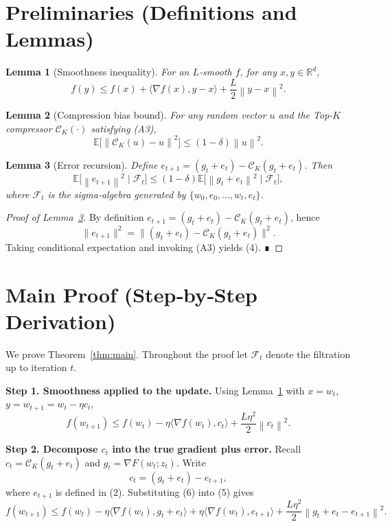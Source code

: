 \documentclass{article}
\newtheorem{lemma}{Lemma}
\newcommand{\E}{\mathbb{E}}
\newcommand{\R}{\mathbb{R}}
\newcommand{\norm}[1]{\left\|#1\right\|}
\newcommand{\grad}{\nabla}
\newcommand{\topk}[1]{\mathcal{C}_{K}(#1)}
\begin{document}
\newpage
\section*{Preliminaries (Definitions and Lemmas)}
\begin{lemma}[Smoothness inequality]\label{lem:smooth}
For an $L$‑smooth $f$, for any $x,y\in\R^{d}$,
\[
f(y)\le f(x)+\langle\grad f(x),y-x\rangle+\frac{L}{2}\norm{y-x}^{2}.
\]
\end{lemma}

\begin{lemma}[Compression bias bound]\label{lem:compression-bias}
For any random vector $u$ and the Top‑$K$ compressor $\topk{\cdot}$ satisfying (A3),
\[
\E\!\big[\norm{\topk{u}-u}^{2}\big]\le (1-\delta)\norm{u}^{2}.
\]
\end{lemma}

\begin{lemma}[Error recursion]\label{lem:error-bnd}
Define $e_{t+1}=(g_t+e_t)-\topk{g_t+e_t}$. Then
\[
\E\!\big[\norm{e_{t+1}}^{2}\mid\mathcal F_t\big]\le (1-\delta)\E\!\big[\norm{g_t+e_t}^{2}\mid\mathcal F_t\big],
\tag{4}
\]
where $\mathcal F_t$ is the sigma‑algebra generated by $\{w_0,e_0,\dots,w_t,e_t\}$.
\end{lemma}
\begin{proof}[Proof of Lemma~\ref{lem:error-bnd}]
By definition $e_{t+1}= (g_t+e_t)-\topk{g_t+e_t}$, hence
\[
\|e_{t+1}\|^{2}= \| (g_t+e_t)-\topk{g_t+e_t}\|^{2}.
\]
Taking conditional expectation and invoking (A3) yields (4). ∎
\end{proof}

\section*{Main Proof (Step‑by‑Step Derivation)}
We prove Theorem~\ref{thm:main}. Throughout the proof let $\mathcal F_t$ denote the filtration up to iteration $t$.

\noindent\textbf{Step 1. Smoothness applied to the update.}  
Using Lemma~\ref{lem:smooth} with $x=w_t$, $y=w_{t+1}=w_t-\eta c_t$,
\[
f(w_{t+1})\le f(w_t)-\eta\langle\grad f(w_t),c_t\rangle+\frac{L\eta^{2}}{2}\norm{c_t}^{2}.
\tag{5}
\]

\noindent\textbf{Step 2. Decompose $c_t$ into the true gradient plus error.}  
Recall $c_t=\topk{g_t+e_t}$ and $g_t=\grad F(w_t;z_t)$. Write
\[
c_t = (g_t+e_t) - e_{t+1},
\tag{6}
\]
where $e_{t+1}$ is defined in (2). Substituting (6) into (5) gives
\[
f(w_{t+1})\le f(w_t)-\eta\langle\grad f(w_t),g_t+e_t\rangle
+\eta\langle\grad f(w_t),e_{t+1}\rangle
+\frac{L\eta^{2}}{2}\norm{g_t+e_t-e_{t+1}}^{2}.
\tag{7}
\]
\end{document}
